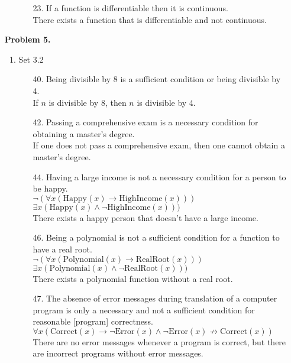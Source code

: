 \documentclass[letterpaper,fleqn]{article}
\begin{document}
\begin{enumerate}
\begin{enumerate}[]
\begin{enumerate}
				\item [23.]
				If a function is differentiable then it is continuous. \\
				There exists a function that is differentiable and not continuous.
			\end{enumerate}
		\end{enumerate}
		
		\item [] \textbf{Problem 5.}
		\begin{enumerate}[]
			\item Set 3.2
			\begin{enumerate}
				\item [40.]
				Being divisible by 8 is a sufficient condition or being divisible by 4. \\
				If $n$ is divisible by 8, then $n$ is divisible by 4.
				
				\item [42.]
				Passing a comprehensive exam is a necessary condition for obtaining a master's degree. \\
				If one does not pass a comprehensive exam, then one cannot obtain a master's degree.
				
				\item [44.]
				Having a large income is not a necessary condition for a person to be happy. \\
				$\neg(\forall x (\text{Happy}(x) \rightarrow \text{HighIncome}(x)))$ \\
				$\exists x (\text{Happy}(x) \wedge \neg \text{HighIncome}(x)))$ \\
				There exists a happy person that doesn't have a large income.
				
				\item [46.]
				Being a polynomial is not a sufficient condition for a function to have a real root. \\
				$\neg(\forall x (\text{Polynomial}(x) \rightarrow \text{RealRoot}(x)))$ \\
				$\exists x (\text{Polynomial}(x) \wedge \neg\text{RealRoot}(x)))$ \\
				There exists a polynomial function without a real root.
				
				\item [47.]
				The absence of error messages during translation of a computer program is only a necessary and not a sufficient condition for reasonable [program] correctness. \\
				$\forall x (\text{Correct}(x) \rightarrow \neg\text{Error}(x) \wedge \neg\text{Error}(x) \not\rightarrow \text{Correct}(x))$ \\
				There are no error messages whenever a program is correct, but there are incorrect programs without error messages.
				

\end{enumerate}
\end{enumerate}
\end{enumerate}
\end{document}
